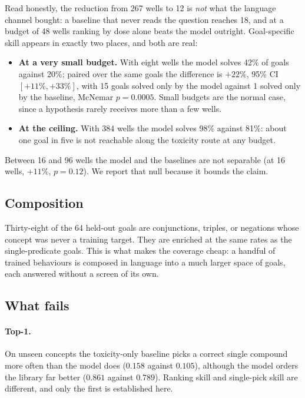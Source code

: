\documentclass[11pt]{article}
\begin{document}
Read honestly, the reduction from 267 wells to 12 is \emph{not} what the language
channel bought: a baseline that never reads the question reaches 18, and at a budget of
48 wells ranking by dose alone beats the model outright. Goal-specific skill appears in
exactly two places, and both are real:

\begin{itemize}\itemsep0.2em
\item \textbf{At a very small budget.} With eight wells the model solves 42\% of goals
against 20\%; paired over the same goals the difference is $+22\%$, 95\% CI
$[+11\%,+33\%]$, with 15 goals solved only by the model against 1 solved only by the
baseline, McNemar $p=0.0005$. Small budgets are the normal case, since a hypothesis
rarely receives more than a few wells.
\item \textbf{At the ceiling.} With 384 wells the model solves 98\% against 81\%: about
one goal in five is not reachable along the toxicity route at any budget.
\end{itemize}

Between 16 and 96 wells the model and the baselines are not separable (at 16 wells,
$+11\%$, $p=0.12$). We report that null because it bounds the claim.

\subsection{Composition}

Thirty-eight of the 64 held-out goals are conjunctions, triples, or negations whose
concept was never a training target. They are enriched at the same rates as the
single-predicate goals. This is what makes the coverage cheap: a handful of trained
behaviours is composed in language into a much larger space of goals, each answered
without a screen of its own.

\subsection{What fails}

\paragraph{Top-1.} On unseen concepts the toxicity-only baseline picks a correct single
compound more often than the model does ($0.158$ against $0.105$), although the model
orders the library far better ($0.861$ against $0.789$). Ranking skill and single-pick
skill are different, and only the first is established here.
\end{document}
